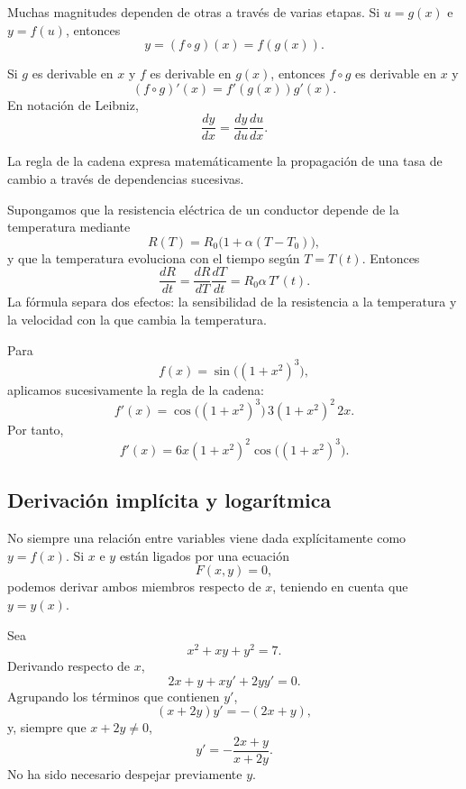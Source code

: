 Muchas magnitudes dependen de otras a través de varias etapas. Si $u=g(x)$ e $y=f(u)$, entonces
\[
y=(f\circ g)(x)=f(g(x)).
\]

\begin{theorem}
Si $g$ es derivable en $x$ y $f$ es derivable en $g(x)$, entonces $f\circ g$ es derivable en $x$ y
\[
(f\circ g)'(x)=f'(g(x))g'(x).
\]
En notación de Leibniz,
\[
\frac{dy}{dx}=\frac{dy}{du}\frac{du}{dx}.
\]
\end{theorem}

La regla de la cadena expresa matemáticamente la propagación de una tasa de cambio a través de dependencias sucesivas.

\begin{example}
Supongamos que la resistencia eléctrica de un conductor depende de la temperatura mediante
\[
R(T)=R_0\bigl(1+\alpha(T-T_0)\bigr),
\]
y que la temperatura evoluciona con el tiempo según $T=T(t)$. Entonces
\[
\frac{dR}{dt}
=
\frac{dR}{dT}\frac{dT}{dt}
=
R_0\alpha\,T'(t).
\]
La fórmula separa dos efectos: la sensibilidad de la resistencia a la temperatura y la velocidad con la que cambia la temperatura.
\end{example}

\begin{example}
Para
\[
f(x)=\sin\!\bigl((1+x^2)^3\bigr),
\]
aplicamos sucesivamente la regla de la cadena:
\[
f'(x)
=
\cos\!\bigl((1+x^2)^3\bigr)\,3(1+x^2)^2\,2x.
\]
Por tanto,
\[
\boxed{
f'(x)=6x(1+x^2)^2\cos\!\bigl((1+x^2)^3\bigr)
}.
\]
\end{example}

\subsection{Derivación implícita y logarítmica}

No siempre una relación entre variables viene dada explícitamente como $y=f(x)$. Si $x$ e $y$ están ligados por una ecuación
\[
F(x,y)=0,
\]
podemos derivar ambos miembros respecto de $x$, teniendo en cuenta que $y=y(x)$.

\begin{example}
Sea
\[
x^2+xy+y^2=7.
\]
Derivando respecto de $x$,
\[
2x+y+xy'+2yy'=0.
\]
Agrupando los términos que contienen $y'$,
\[
(x+2y)y'=-(2x+y),
\]
y, siempre que $x+2y\neq0$,
\[
\boxed{
y'=-\frac{2x+y}{x+2y}
}.
\]
No ha sido necesario despejar previamente $y$.
\end{example}

